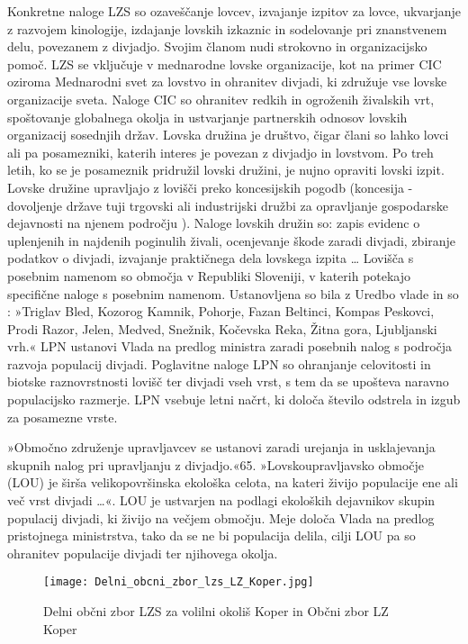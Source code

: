 \documentclass[a4paper,12pt,openright]{book}
\begin{document}
Konkretne naloge LZS so ozaveščanje lovcev, izvajanje izpitov za lovce, ukvarjanje z razvojem kinologije, izdajanje lovskih izkaznic in sodelovanje pri znanstvenem delu, povezanem z divjadjo. 
Svojim članom nudi strokovno in organizacijsko pomoč. 
LZS se vključuje v mednarodne lovske organizacije, kot na primer CIC oziroma Mednarodni svet za lovstvo in ohranitev divjadi, ki združuje vse lovske organizacije sveta.
Naloge CIC so ohranitev redkih in ogroženih živalskih vrt, spoštovanje globalnega okolja in ustvarjanje partnerskih odnosov lovskih organizacij sosednjih držav.
Lovska družina je društvo, čigar člani so lahko lovci ali pa posamezniki, katerih interes je povezan z divjadjo in lovstvom. 
Po treh letih, ko se je posameznik pridružil lovski družini, je nujno opraviti lovski izpit.
Lovske družine upravljajo z lovišči preko koncesijskih pogodb (koncesija - dovoljenje države tuji trgovski ali industrijski družbi za opravljanje gospodarske dejavnosti na njenem področju \cite{fran}).
Naloge lovskih družin so: zapis evidenc o uplenjenih in najdenih poginulih živali, ocenjevanje škode zaradi divjadi, zbiranje podatkov o divjadi, izvajanje praktičnega dela lovskega izpita … 
Lovišča s posebnim namenom so območja v Republiki Sloveniji, v katerih potekajo specifične naloge s posebnim namenom.
Ustanovljena so bila z Uredbo vlade in so : »Triglav Bled, Kozorog Kamnik, Pohorje, Fazan Beltinci, Kompas Peskovci, Prodi Razor, Jelen, Medved, Snežnik, Kočevska Reka, Žitna gora, Ljubljanski vrh.«\parencite[65]{Lov}
LPN ustanovi Vlada na predlog ministra zaradi posebnih nalog s področja razvoja populacij divjadi. 
Poglavitne naloge LPN so ohranjanje celovitosti in biotske raznovrstnosti lovišč ter divjadi vseh vrst, s tem da se upošteva naravno populacijsko razmerje. 
LPN vsebuje letni načrt, ki določa število odstrela in izgub za posamezne vrste.\cite{Div_63_71}

»Območno združenje upravljavcev se ustanovi zaradi urejanja in usklajevanja skupnih nalog pri upravljanju z divjadjo.«{65}.
»Lovskoupravljavsko območje (LOU) je širša velikopovršinska ekološka celota, na kateri živijo populacije ene ali več vrst divjadi …«\parencite[66]{Lov}. 
LOU je ustvarjen na podlagi ekoloških dejavnikov skupin populacij divjadi, ki živijo na večjem območju. 
Meje določa Vlada na predlog pristojnega ministrstva, tako da se ne bi populacija delila, cilji LOU pa so ohranitev populacije divjadi ter njihovega okolja.

\begin{figure}[h!]
    \centering
    \texttt{[image: Delni\_obcni\_zbor\_lzs\_LZ\_Koper.jpg]}
    \caption{Delni občni zbor LZS za volilni okoliš Koper in Občni zbor LZ Koper \cite{LZ_Koper_DOZ}}
    \label{fig:lzs_koper}
\end{figure}
\end{document}
